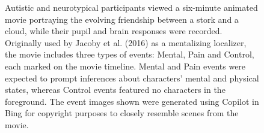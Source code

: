 \begin{figure}[!ht]
	\centering
	\caption{Autistic and neurotypical participants viewed a six-minute animated movie portraying the evolving friendship between a stork and a cloud, while their pupil and brain responses were recorded. Originally used by Jacoby et al. (2016) as a mentalizing localizer, the movie includes three types of events: Mental, Pain and Control, each marked on the movie timeline. Mental and Pain events were expected to prompt inferences about characters' mental and physical states, whereas Control events featured no characters in the foreground. The event images shown were generated using Copilot in Bing for copyright purposes to closely resemble scenes from the movie.}
    \vspace*{-10pt}
	\label{fig:task-fig}
\end{figure}


